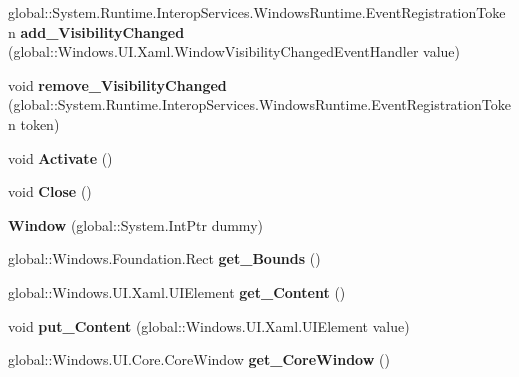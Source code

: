\begin{DoxyCompactItemize}
global\+::\+System.\+Runtime.\+Interop\+Services.\+Windows\+Runtime.\+Event\+Registration\+Token {\bfseries add\+\_\+\+Visibility\+Changed} (global\+::\+Windows.\+U\+I.\+Xaml.\+Window\+Visibility\+Changed\+Event\+Handler value)
\item 
\mbox{\label{class_windows_1_1_u_i_1_1_xaml_1_1_window_ad984391809f48d0412161ff575cd570d}} 
void {\bfseries remove\+\_\+\+Visibility\+Changed} (global\+::\+System.\+Runtime.\+Interop\+Services.\+Windows\+Runtime.\+Event\+Registration\+Token token)
\item 
\mbox{\label{class_windows_1_1_u_i_1_1_xaml_1_1_window_a92d7288cb5bc807e56222e347e2e7603}} 
void {\bfseries Activate} ()
\item 
\mbox{\label{class_windows_1_1_u_i_1_1_xaml_1_1_window_ab6b6a8e512a08f5ba35b8bc367dfeea8}} 
void {\bfseries Close} ()
\item 
\mbox{\label{class_windows_1_1_u_i_1_1_xaml_1_1_window_a2f884c667c9bd45a983c8611d71c365b}} 
{\bfseries Window} (global\+::\+System.\+Int\+Ptr dummy)
\item 
\mbox{\label{class_windows_1_1_u_i_1_1_xaml_1_1_window_a3b4023c9ffd4210037266cde25034d90}} 
global\+::\+Windows.\+Foundation.\+Rect {\bfseries get\+\_\+\+Bounds} ()
\item 
\mbox{\label{class_windows_1_1_u_i_1_1_xaml_1_1_window_ae8eec75ce505d25ba6c2553adc1784b5}} 
global\+::\+Windows.\+U\+I.\+Xaml.\+U\+I\+Element {\bfseries get\+\_\+\+Content} ()
\item 
\mbox{\label{class_windows_1_1_u_i_1_1_xaml_1_1_window_ad4e7eb6e2bbbcc9db175cc0467fa6060}} 
void {\bfseries put\+\_\+\+Content} (global\+::\+Windows.\+U\+I.\+Xaml.\+U\+I\+Element value)
\item 
\mbox{\label{class_windows_1_1_u_i_1_1_xaml_1_1_window_a4ea24c3c21a169c23a2ae6ca99188f43}} 
global\+::\+Windows.\+U\+I.\+Core.\+Core\+Window {\bfseries get\+\_\+\+Core\+Window} ()

\end{DoxyCompactItemize}
